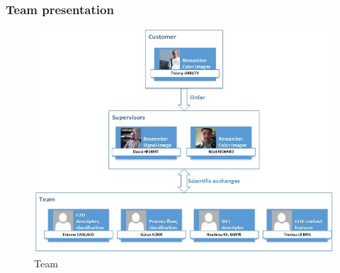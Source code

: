 \documentclass[xcolor=table]{beamer}
\begin{document}
\begin{frame} \frametitle{Team presentation}

\begin{figure}[h]
    \center
    \includegraphics[scale=0.5]{Dessin1.jpg}
    \caption{Team}\label{fig:team}
\end{figure}

\end{frame}



\end{document}

